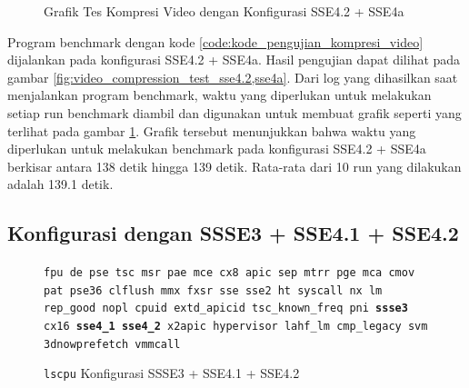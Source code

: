 \begin{figure}
    \centering
    \caption{Grafik Tes Kompresi Video dengan Konfigurasi SSE4.2 + SSE4a}
    \label{fig:video_compression_test_sse4.2,sse4a_graph}
\end{figure}

Program benchmark dengan kode \ref{code:kode_pengujian_kompresi_video} dijalankan pada konfigurasi SSE4.2 + SSE4a. Hasil pengujian dapat dilihat pada gambar \ref{fig:video_compression_test_sse4.2,sse4a}. Dari log yang dihasilkan saat menjalankan program benchmark, waktu yang diperlukan untuk melakukan setiap run benchmark diambil dan digunakan untuk membuat grafik seperti yang terlihat pada gambar \ref{fig:video_compression_test_sse4.2,sse4a_graph}. Grafik tersebut menunjukkan bahwa waktu yang diperlukan untuk melakukan benchmark pada konfigurasi SSE4.2 + SSE4a berkisar antara 138 detik hingga 139 detik. Rata-rata dari 10 run yang dilakukan adalah 139.1 detik.

\subsection{Konfigurasi dengan SSSE3 + SSE4.1 + SSE4.2}
\begin{figure}
    \texttt{fpu de pse tsc msr pae mce cx8 apic sep mtrr pge mca cmov pat pse36 clflush mmx fxsr sse sse2 ht syscall nx lm rep\_good nopl cpuid extd\_apicid tsc\_known\_freq pni \textbf{ssse3} cx16 \textbf{sse4\_1} \textbf{sse4\_2} x2apic hypervisor lahf\_lm cmp\_legacy svm 3dnowprefetch vmmcall}
    \caption{\texttt{lscpu} Konfigurasi SSSE3 + SSE4.1 + SSE4.2}
    \label{fig:lscpu_video_compression_test_ssse3,sse4.1,sse4.2}
\end{figure}

